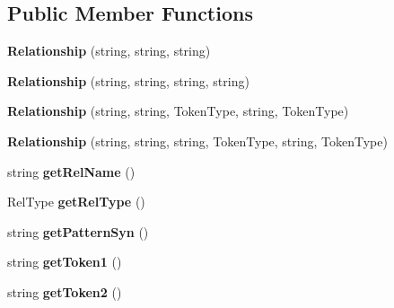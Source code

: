 \subsection*{Public Member Functions}
\begin{DoxyCompactItemize}
\item 
\hypertarget{class_relationship_a7f36fabc740564f60c1f154778c22c5c}{{\bfseries Relationship} (string, string, string)}\label{class_relationship_a7f36fabc740564f60c1f154778c22c5c}

\item 
\hypertarget{class_relationship_a7334be67ab7c0a55892bbe07d8e81c12}{{\bfseries Relationship} (string, string, string, string)}\label{class_relationship_a7334be67ab7c0a55892bbe07d8e81c12}

\item 
\hypertarget{class_relationship_a041d44df3e13327959779049cdf5cb34}{{\bfseries Relationship} (string, string, Token\+Type, string, Token\+Type)}\label{class_relationship_a041d44df3e13327959779049cdf5cb34}

\item 
\hypertarget{class_relationship_ac263a2f68eedd358b7181e3541b0d4b5}{{\bfseries Relationship} (string, string, string, Token\+Type, string, Token\+Type)}\label{class_relationship_ac263a2f68eedd358b7181e3541b0d4b5}

\item 
\hypertarget{class_relationship_ac4025830604b06763d326889306211bb}{string {\bfseries get\+Rel\+Name} ()}\label{class_relationship_ac4025830604b06763d326889306211bb}

\item 
\hypertarget{class_relationship_a8a3ae5b6fe485d1cb868aacb642b9fba}{Rel\+Type {\bfseries get\+Rel\+Type} ()}\label{class_relationship_a8a3ae5b6fe485d1cb868aacb642b9fba}

\item 
\hypertarget{class_relationship_ae0e25e310af24b05a594d327b30eafb2}{string {\bfseries get\+Pattern\+Syn} ()}\label{class_relationship_ae0e25e310af24b05a594d327b30eafb2}

\item 
\hypertarget{class_relationship_adafdb9a83c07ab93532f118d296e86d3}{string {\bfseries get\+Token1} ()}\label{class_relationship_adafdb9a83c07ab93532f118d296e86d3}

\item 
\hypertarget{class_relationship_a0c6220f464f6a389219b709e094dd4da}{string {\bfseries get\+Token2} ()}\label{class_relationship_a0c6220f464f6a389219b709e094dd4da}


\end{DoxyCompactItemize}
